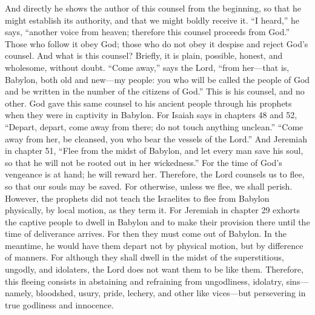 And directly he shows the author of this counsel from the beginning, so that he might establish its authority, and that we might boldly receive it. “I heard,” he says, “another voice from heaven; therefore this counsel proceeds from God.” Those who follow it obey God; those who do not obey it despise and reject God’s counsel. And what is this counsel? Briefly, it is plain, possible, honest, and wholesome, without doubt. “Come away,” says the Lord, “from her—that is, Babylon, both old and new—my people: you who will be called the people of God and be written in the number of the citizens of God.” This is his counsel, and no other. God gave this same counsel to his ancient people through his prophets when they were in captivity in Babylon. For Isaiah says in chapters 48 and 52, “Depart, depart, come away from there; do not touch anything unclean.” “Come away from her, be cleansed, you who bear the vessels of the Lord.” And Jeremiah in chapter 51, “Flee from the midst of Babylon, and let every man save his soul, so that he will not be rooted out in her wickedness.” For the time of God’s vengeance is at hand; he will reward her. Therefore, the Lord counsels us to flee, so that our souls may be saved. For otherwise, unless we flee, we shall perish. However, the prophets did not teach the Israelites to flee from Babylon physically, by local motion, as they term it. For Jeremiah in chapter 29 exhorts the captive people to dwell in Babylon and to make their provision there until the time of deliverance arrives. For then they must come out of Babylon. In the meantime, he would have them depart not by physical motion, but by difference of manners. For although they shall dwell in the midst of the superstitious, ungodly, and idolaters, the Lord does not want them to be like them. Therefore, this fleeing consists in abstaining and refraining from ungodliness, idolatry, sins—namely, bloodshed, usury, pride, lechery, and other like vices—but persevering in true godliness and innocence.


